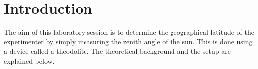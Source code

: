 
\chapter{Introduction}
\label{chap:einleitung}

The aim of this laboratory session is to determine the geographical latitude of the experimenter by simply measuring the zenith angle of the sun. This is done using a device called a theodolite. The theoretical background and the setup are explained below.
